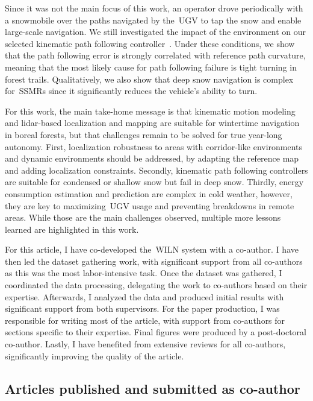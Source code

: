 \documentclass[12pt,letterpaper,oneside]{article}
\begin{document}
Since it was not the main focus of this work, an operator drove periodically with a snowmobile over the paths navigated by the~\ac{UGV} to tap the snow and enable large-scale navigation.
We still investigated the impact of the environment on our selected kinematic path following controller~\citep{Huskic2017}.
Under these conditions, we show that the path following error is strongly correlated with reference path curvature, meaning that the most likely cause for path following failure is tight turning in forest trails.
Qualitatively, we also show that deep snow navigation is complex for~\acp{SSMR} since it significantly reduces the vehicle's ability to turn.

For this work, the main take-home message is that kinematic motion modeling and lidar-based localization and mapping are suitable for wintertime navigation in boreal forests, but that challenges remain to be solved for true year-long autonomy.
First, localization robustness to areas with corridor-like environments and dynamic environments should be addressed, by adapting the reference map and adding localization constraints.
Secondly, kinematic path following controllers are suitable for condensed or shallow snow but fail in deep snow.
Thirdly, energy consumption estimation and prediction are complex in cold weather, however, they are key to maximizing~\ac{UGV} usage and preventing breakdowns in remote areas.
While those are the main challenges observed, multiple more lessons learned are highlighted in this work.

For this article, I have co-developed the~\ac{WILN} system with a co-author.
I have then led the dataset gathering work, with significant support from all co-authors as this was the most labor-intensive task.
Once the dataset was gathered,  I coordinated the data processing, delegating the work to co-authors based on their expertise.
Afterwards, I analyzed the data and produced initial results with significant support from both supervisors.
For the paper production, I was responsible for writing most of the article, with support from co-authors for sections specific to their expertise.
Final figures were produced by a post-doctoral co-author.
Lastly, I have benefited from extensive reviews for all co-authors, significantly improving the quality of the article.

\subsection{Articles published and submitted as co-author}
\end{document}
